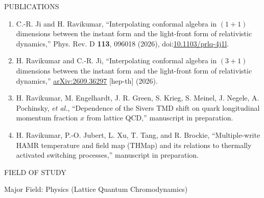 \vspace{0.1in}
\begin{center}
PUBLICATIONS
\end{center}
\begin{flushleft}
\begin{enumerate}
\item C.-R. Ji and H. Ravikumar, ``Interpolating conformal algebra in
      $(1+1)$ dimensions between the instant form and the light-front
      form of relativistic dynamics,''
      Phys. Rev. D \textbf{113}, 096018 (2026),
      doi:\href{https://doi.org/10.1103/prlq-4j1l}{10.1103/prlq-4j1l}.
\item H. Ravikumar and C.-R. Ji, ``Interpolating conformal algebra in
      $(3+1)$ dimensions between the instant form and the light-front
      form of relativistic dynamics,''
      \href{https://arxiv.org/abs/2609.36297}{arXiv:2609.36297} [hep-th] (2026).
\item H. Ravikumar, M. Engelhardt, J. R. Green, S. Krieg, S. Meinel,
      J. Negele, A. Pochinsky, \textit{et al.}, ``Dependence of the
      Sivers TMD shift on quark longitudinal momentum fraction $x$
      from lattice QCD,'' manuscript in preparation.
\item H. Ravikumar, P.-O. Jubert, L. Xu, T. Tang, and R. Brockie,
      ``Multiple-write HAMR temperature and field map (THMap) and its
      relations to thermally activated switching processes,''
      manuscript in preparation.
\end{enumerate}
\end{flushleft}


\vspace{0.1in}
\begin{center}
FIELD OF STUDY
\end{center}
\begin{flushleft}
Major Field: Physics (Lattice Quantum Chromodynamics)
\end{flushleft}
